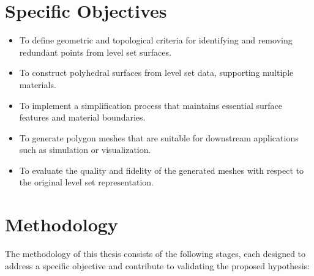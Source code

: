 \documentclass[submission]{eptcs}
\begin{document}
\section{Specific Objectives}

\begin{itemize}
    \item To define geometric and topological criteria for identifying and removing redundant points from level set surfaces.
    \item To construct polyhedral surfaces from level set data, supporting multiple materials.
    \item To implement a simplification process that maintains essential surface features and material boundaries.
    \item To generate polygon meshes that are suitable for downstream applications such as simulation or visualization.
    \item To evaluate the quality and fidelity of the generated meshes with respect to the original level set representation.
\end{itemize}

\section{Methodology}

The methodology of this thesis consists of the following stages, each designed to address a specific objective and contribute to validating the proposed hypothesis:
\end{document}
